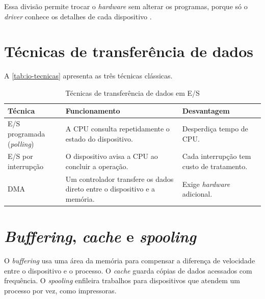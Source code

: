 Essa divisão permite trocar o \textit{hardware} sem alterar os programas, porque só o
\textit{driver} conhece os detalhes de cada dispositivo \cite{silberschatz2015}.

\section{Técnicas de transferência de dados}\label{sec:tecnicas-es}

A \autoref{tab:io-tecnicas} apresenta as três técnicas clássicas.

\begin{table}[H]
    \centering
    \caption{Técnicas de transferência de dados em E/S}
    \label{tab:io-tecnicas}
    \begin{tabularx}{\linewidth}{p{3.4cm}XX}
        \toprule
        \textbf{Técnica} & \textbf{Funcionamento} & \textbf{Desvantagem} \\
        \midrule
        E/S programada (\textit{polling}) & A CPU consulta repetidamente o estado do dispositivo. & Desperdiça tempo de CPU. \\
        E/S por interrupção & O dispositivo avisa a CPU ao concluir a operação. & Cada interrupção tem custo de tratamento. \\
        DMA & Um controlador transfere os dados direto entre o dispositivo e a memória. & Exige \textit{hardware} adicional. \\
        \bottomrule
    \end{tabularx}
\end{table}

\section{\textit{Buffering}, \textit{cache} e \textit{spooling}}\label{sec:buffering}

O \textit{buffering} usa uma área da memória para compensar a diferença de velocidade entre o
dispositivo e o processo. O \textit{cache} guarda cópias de dados acessados com frequência. O
\textit{spooling} enfileira trabalhos para dispositivos que atendem um processo por vez, como
impressoras.
